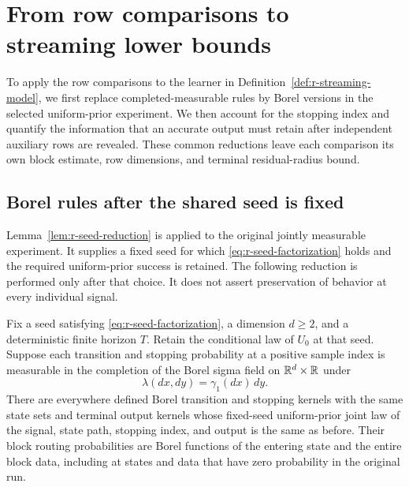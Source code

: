 \section{From row comparisons to streaming lower bounds}
\label{sec:r-streaming}

To apply the row comparisons to the learner in
Definition~\ref{def:r-streaming-model}, we first replace
completed-measurable rules by Borel versions in the selected
uniform-prior experiment.  We then account for the stopping index
and quantify the information that an accurate output must retain
after independent auxiliary rows are revealed.  These common
reductions leave each comparison its own block estimate, row
dimensions, and terminal residual-radius bound.

\subsection{Borel rules after the shared seed is fixed}
\label{subsec:r-borel-reduction}

Lemma~\ref{lem:r-seed-reduction} is applied to the original jointly
measurable experiment.  It supplies a fixed seed for which
\eqref{eq:r-seed-factorization} holds and the required uniform-prior
success is retained.  The following reduction is performed only
after that choice.  It does not assert preservation of behavior at
every individual signal.

\begin{lemma}
\label{lem:r-borel-kernels}
Fix a seed satisfying \eqref{eq:r-seed-factorization}, a dimension
\(d\ge2\), and a deterministic finite horizon \(T\).  Retain the
conditional law of \(U_0\) at that seed.  Suppose each transition
and stopping probability at a positive sample index is measurable
in the completion of the Borel sigma field on
\(\mathbb R^d\times\mathbb R\) under
\[
 \lambda(dx,dy)=\gamma_1(dx)\,dy .
\]
There are everywhere defined Borel transition and stopping kernels
with the same state sets and terminal output kernels whose
fixed-seed uniform-prior joint law of the signal, state path,
stopping index, and output is the same as before.  Their block
routing probabilities are Borel functions of the entering state
and the entire block data, including at states and data that have
zero probability in the original run.
\end{lemma}

